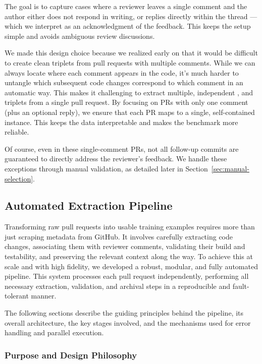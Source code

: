 The goal is to capture cases where a reviewer leaves a single comment and the author either does not
respond in writing, or replies directly within the thread — which we interpret as an acknowledgment
of the feedback. This keeps the setup simple and avoids ambiguous review discussions.

We made this design choice because we realized early on that it would be difficult to create clean
triplets from pull requests with multiple comments. While we can always locate where each comment
appears in the code, it's much harder to untangle which subsequent code changes correspond to which
comment in an automatic way. This makes it challenging to extract multiple, independent \subCode,
\revComment and \revCode triplets from a single pull request. By focusing on PRs with only one
comment (plus an optional reply), we ensure that each PR maps to a single, self-contained instance.
This keeps the data interpretable and makes the benchmark more reliable.

Of course, even in these single-comment PRs, not all follow-up commits are guaranteed to directly
address the reviewer’s feedback. We handle these exceptions through manual validation, as detailed
later in Section~\ref{sec:manual-selection}.

\subsection{Automated Extraction Pipeline}
\label{sec:pipeline}
Transforming raw pull requests into usable training examples requires more than just scraping
metadata from GitHub. It involves carefully extracting code changes, associating them with reviewer
comments, validating their build and testability, and preserving the relevant context along the way.
To achieve this at scale and with high fidelity, we developed a robust, modular, and fully automated
pipeline. This system processes each pull request independently, performing all necessary
extraction, validation, and archival steps in a reproducible and fault-tolerant manner.

The following sections describe the guiding principles behind the pipeline, its overall
architecture, the key stages involved, and the mechanisms used for error handling and parallel
execution.

\subsubsection{Purpose and Design Philosophy}


